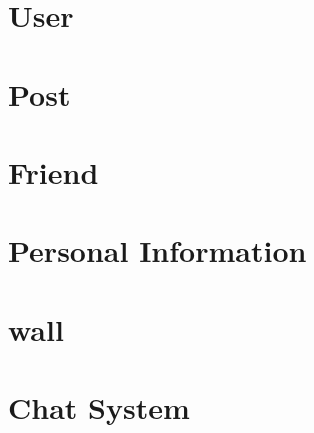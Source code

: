 \section{User}


\section{Post}



\section{Friend}


\section{Personal Information}


\section{wall}


\section{Chat System}

